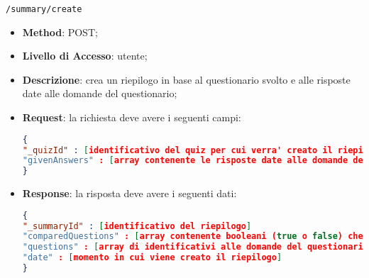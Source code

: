 \item \texttt{/summary/create}
		\begin{itemize}
			\item \textbf{Method}: POST;
			\item \textbf{Livello di Accesso}: utente;
			\item \textbf{Descrizione}: crea un riepilogo in base al questionario svolto e alle risposte date alle domande del questionario;
			\item \textbf{Request}: la richiesta deve avere i seguenti campi:
\begin{lstlisting}[language=json,firstnumber=1]
{
"_quizId" : [identificativo del quiz per cui verra' creato il riepilogo]
"givenAnswers" : [array contenente le risposte date alle domande del questionario svolto]
}
\end{lstlisting}
			\item \textbf{Response}: la risposta deve avere i seguenti dati:
\begin{lstlisting}[language=json,firstnumber=1]
{
"_summaryId" : [identificativo del riepilogo]
"comparedQuestions" : [array contenente booleani (true o false) che definiscono se le risposte date alle domande del questionario sono corrette o meno]
"questions" : [array di identificativi alle domande del questionario svolto]
"date" : [momento in cui viene creato il riepilogo]
}
\end{lstlisting}
		\end{itemize}